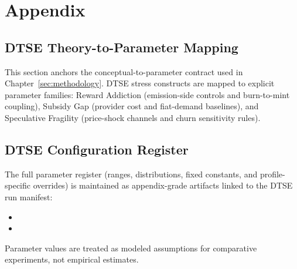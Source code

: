 \section{Appendix}
\label{sec:appendix}

\subsection{DTSE Theory-to-Parameter Mapping}
\label{app:dtse_theory_mapping}
This section anchors the conceptual-to-parameter contract used in Chapter~\ref{sec:methodology}. DTSE stress constructs are mapped to explicit parameter families: Reward Addiction (emission-side controls and burn-to-mint coupling), Subsidy Gap (provider cost and fiat-demand baselines), and Speculative Fragility (price-shock channels and churn sensitivity rules).

\subsection{DTSE Configuration Register}
\label{app:dtse_config_register}
The full parameter register (ranges, distributions, fixed constants, and profile-specific overrides) is maintained as appendix-grade artifacts linked to the DTSE run manifest:
\begin{itemize}
    \item {}
    \item {}
\end{itemize}
Parameter values are treated as modeled assumptions for comparative experiments, not empirical estimates.


